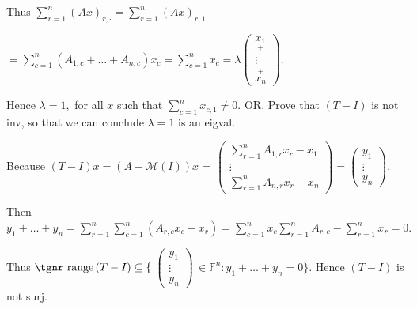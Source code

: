 \documentclass[a4paper, 11pt, UTF8]{article}
\def\range{{\textup{\tgnr range}}\,}
\def\Mt{\mathcal{M}}
\def\Fbb{{\mathbb{F}}}
\def\Hb{{\large\Blind{(b) }}}
\def\Or{{\large O{\footnotesize R.} }}
\begin{document}
\begin{large}
Thus $\sum\limits_{r=1}^n (Ax)_{r,\cdot}=\sum\limits_{r=1}^n (Ax)_{r,1}$\par\qquad\qquad\qquad\qquad\quad
$=\sum\limits_{c=1}^n(A_{1,c}+\dots+A_{n,c})x_c=\sum\limits_{c=1}^n x_c=\lambda${\small$\begin{pmatrix}
\underset{+}{x_1}\\ \vdots\\ \overset{+}{x_n}
\end{pmatrix}.$}\par\quad\Hb
Hence $\lambda=1,$ for all $x$ such that $\sum\limits_{c=1}^n x_{c,1}\neq 0.$\PfEnd\vspace{6pt}\quad\Hb
\Or Prove that $(T-I)$ is not inv, so that we can conclude $\lambda=1$ is an eigval.\par\quad\Hb
Because $(T-I)x=\left(A-\Mt(I)\right)x=\,${\small$\begin{pmatrix} \sum\limits_{r=1}^n A_{1,r}x_r-x_1\\ \vdots\\ \sum\limits_{r=1}^n A_{n,r}x_r-x_n\end{pmatrix}=\begin{pmatrix} y_1\\ \vdots\\ y_n\end{pmatrix}.$}\par\quad\Hb
Then $y_1+\dots+y_n=\sum\limits_{r=1}^n\sum\limits_{c=1}^n (A_{r,c}x_c-x_r)=\sum\limits_{c=1}^n x_c\sum\limits_{r=1}^n A_{r,c}-\sum\limits_{r=1}^n x_r=0.$\par\vspace{6pt}\quad\Hb
Thus $\range(T-I)\subseteq\{\,${\small$\begin{pmatrix}
y_1 \\ \vdots \\ y_n\end{pmatrix}$}$\,\in\Fbb^n:y_1+\dots+y_n=0\}.$ Hence $(T-I)$ is not surj.\PfEnd
\SepLine


\end{large}
\end{document}
